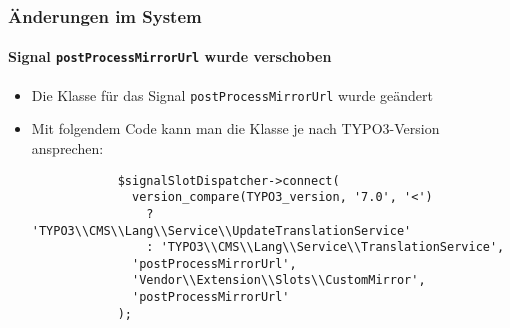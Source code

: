 \begin{frame}[fragile]
	\frametitle{Änderungen im System}
	\framesubtitle{Signal \texttt{postProcessMirrorUrl} wurde verschoben}

	\lstset{basicstyle=\tiny\ttfamily}

	\begin{itemize}

		\item Die Klasse für das Signal \texttt{postProcessMirrorUrl} wurde geändert

		\breakingchange

		\item Mit folgendem Code kann man die Klasse je nach TYPO3-Version ansprechen:

		\begin{lstlisting}
			$signalSlotDispatcher->connect(
			  version_compare(TYPO3_version, '7.0', '<')
			    ? 'TYPO3\\CMS\\Lang\\Service\\UpdateTranslationService'
			    : 'TYPO3\\CMS\\Lang\\Service\\TranslationService',
			  'postProcessMirrorUrl',
			  'Vendor\\Extension\\Slots\\CustomMirror',
			  'postProcessMirrorUrl'
			);
		\end{lstlisting}

	\end{itemize}

\end{frame}

